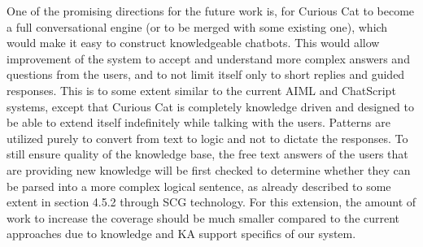 One of the promising directions for the future work is, for Curious Cat to become a full conversational engine (or to be merged with some existing one), which would make it easy to construct knowledgeable chatbots. This would allow improvement of the system to accept and understand more complex answers and questions from the users, and to not limit itself only to short replies and guided responses. This is to some extent similar to the current AIML and ChatScript systems, except that Curious Cat is completely knowledge driven and designed to be able to extend itself indefinitely while talking with the users. Patterns are utilized purely to convert from text to logic and not to dictate the responses. To still ensure quality of the knowledge base, the free text answers of the users that are providing new knowledge will be first checked to determine whether they can be parsed into a more complex logical sentence, as already described to some extent in section 4.5.2 through SCG technology. For this extension, the amount of work to increase the coverage should be much smaller compared to the current approaches due to knowledge and KA support specifics of our system.

